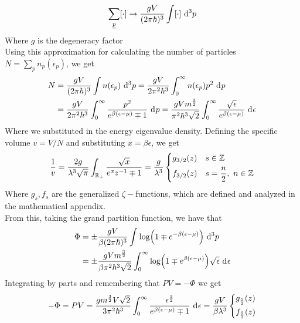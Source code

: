 \documentclass[../qm.tex]{subfiles}
\begin{document}
	\begin{equation}
		\sum_{\vec{p}}[\cdot]\to\frac{gV}{(2\pi\hbar)^3}\int[\cdot]\diff[3]{p}
		\label{eq:sumsubstitution}
	\end{equation}
	Where $g$ is the degeneracy factor\\
	Using this approximation for calculating the number of particles $N=\sum_pn_p(\epsilon_p)$, we get
	\begin{equation}
		\begin{aligned}
			N&=\frac{gV}{(2\pi\hbar)^3}\int n(\epsilon_p)\diff[3]{p}=\frac{gV}{2\pi^2\hbar^3}\int_0^{\infty}n(\epsilon_p)p^2\diff{p}\\
			&=\frac{gV}{2\pi^2\hbar^3}\int_{0}^{\infty}\frac{p^2}{e^{\beta(\epsilon-\mu)}\mp1}\diff{p}=\frac{gVm^{\frac{3}{2}}}{\pi^2\hbar^3\sqrt{2}}\int_{0}^{\infty}\frac{\sqrt{\epsilon}}{e^{\beta(\epsilon-\mu)}}\diff{\epsilon}
		\end{aligned}
		\label{eq:particlenumberintegral}
	\end{equation}
	Where we substituted in the energy eigenvalue density. Defining the specific volume $v=V/N$ and substituting $x=\beta\epsilon$, we get
	\begin{equation}
		\frac{1}{v}=\frac{2g}{\lambda^3\sqrt{\pi}}\int_{\mathbb{R}_+}\frac{\sqrt{x}}{e^xz^{-1}\mp1}=\frac{g}{\lambda^3}\begin{dcases}g_{3/2}(z)&s\in\mathbb{Z}\\f_{3/2}(z)&s=\frac{n}{2},\ n\in\mathbb{Z}\end{dcases}
		\label{eq:specificvolume}
	\end{equation}
	Where $g_s,f_s$ are the generalized $\zeta-$functions, which are defined and analyzed in the mathematical appendix.\\
	From this, taking the grand partition function, we have that
	\begin{equation}
		\begin{aligned}
			\Phi&=\pm\frac{gV}{\beta(2\pi\hbar)^3}\int_{}^{}\log(1\mp e^{-\beta(\epsilon-\mu)})\diff[3]{p}\\
			&=\pm\frac{gVm^{\frac{3}{2}}}{\beta\pi^2\hbar^3\sqrt{2}}\int_{0}^{\infty}\log(1\mp e^{\beta(\epsilon-\mu)})\sqrt{\epsilon}\diff{\epsilon}
		\end{aligned}
		\label{eq:grandcanonintegral}
	\end{equation}
	Integrating by parts and remembering that $PV=-\Phi$ we get
	\begin{equation}
		-\Phi=PV=\frac{gm^{\frac{3}{2}}V\sqrt{2}}{3\pi^2\hbar^3}\int_{0}^{\infty}\frac{\epsilon^{\frac{3}{2}}}{e^{\beta(\epsilon-\mu)}\mp1}\diff{\epsilon}=\frac{gV}{\beta\lambda^3}\begin{dcases}g_{\frac{5}{2}}(z)\\f_{\frac{5}{2}}(z)\end{dcases}
		\label{eq:fermigasstateeq}
	\end{equation}
\end{document}
